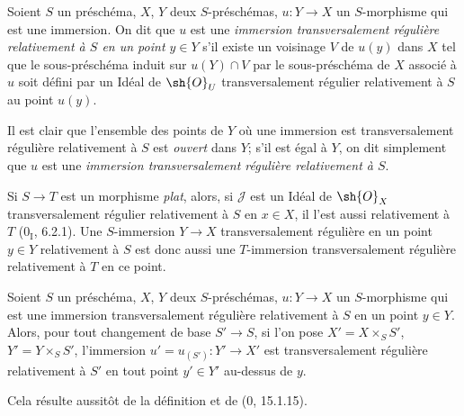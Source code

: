 \begin{definition}[19.2.2]
\label{IV.19.2.2}
Soient $S$ un préschéma, $X$, $Y$ deux $S$-préschémas, $u:Y\to X$ un $S$-morphisme qui est une immersion. On dit que $u$ est une \emph{immersion transversalement régulière relativement à $S$ en un point $y\in Y$} s'il existe un voisinage $V$ de $u(y)$ dans $X$ tel que le sous-préschéma induit sur $u(Y)\cap V$ par le sous-préschéma de $X$ associé à $u$ soit défini par un Idéal de $\sh{O}_U$ transversalement régulier relativement à $S$ au point $u(y)$.

Il est clair que l'ensemble des points de $Y$ où une immersion est transversalement régulière relativement à $S$ est \emph{ouvert} dans $Y$; s'il est égal à $Y$, on dit simplement que $u$ est une \emph{immersion transversalement régulière relativement à $S$}.

Si $S\to T$ est un morphisme \emph{plat}, alors, si $\mathscr J$ est un Idéal de $\sh{O}_X$ transversalement régulier relativement à $S$ en $x\in X$, il l'est aussi relativement à $T$ ($0_{\mathrm I}$, 6.2.1). Une $S$-immersion $Y\to X$ transversalement régulière en un point $y\in Y$ relativement à $S$ est donc aussi une $T$-immersion transversalement régulière relativement à $T$ en ce point.
\end{definition}

\begin{proposition}[19.2.3]
\label{IV.19.2.3}
Soient $S$ un préschéma, $X$, $Y$ deux $S$-préschémas, $u:Y\to X$ un $S$-morphisme qui est une immersion transversalement régulière relativement à $S$ en un point $y\in Y$. Alors, pour tout changement de base $S'\to S$, si l'on pose $X'=X\times_S S'$, $Y'=Y\times_S S'$, l'immersion $u'=u_{(S')}:Y'\to X'$ est transversalement régulière relativement à $S'$ en tout point $y'\in Y'$ au-dessus de $y$.
\end{proposition}

Cela résulte aussitôt de la définition et de ($0$, 15.1.15).

